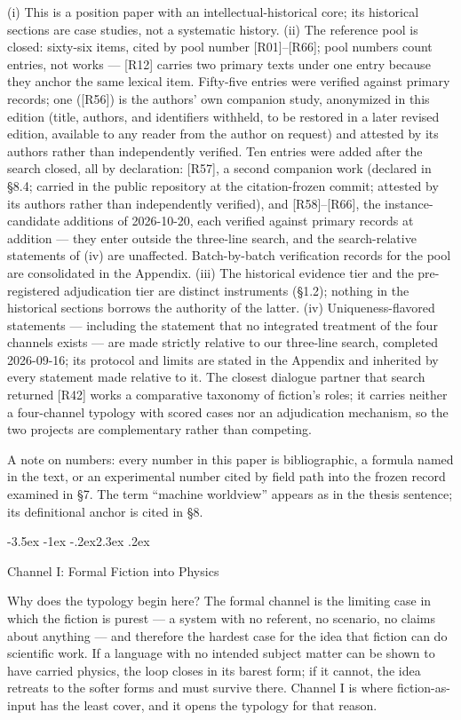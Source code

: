 \documentclass[11pt,a4paper]{article}
\makeatletter
\renewcommand\section{\@startsection{section}{1}{\z@}%
  {-3.5ex \@plus -1ex \@minus -.2ex}{2.3ex \@plus .2ex}%
  {\normalfont\Large\bfseries\raggedright}}
\makeatother
\begin{document}
(i) This is a position paper with an intellectual-historical core; its historical sections are case studies, not a systematic history. (ii) The reference pool is closed: sixty-six items, cited by pool number [R01]–[R66]; pool numbers count entries, not works — [R12] carries two primary texts under one entry because they anchor the same lexical item. Fifty-five entries were verified against primary records; one ([R56]) is the authors' own companion study, anonymized in this edition (title, authors, and identifiers withheld, to be restored in a later revised edition, available to any reader from the author on request) and attested by its authors rather than independently verified. Ten entries were added after the search closed, all by declaration: [R57], a second companion work (declared in §8.4; carried in the public repository at the citation-frozen commit; attested by its authors rather than independently verified), and [R58]–[R66], the instance-candidate additions of 2026-10-20, each verified against primary records at addition — they enter outside the three-line search, and the search-relative statements of (iv) are unaffected. Batch-by-batch verification records for the pool are consolidated in the Appendix. (iii) The historical evidence tier and the pre-registered adjudication tier are distinct instruments (§1.2); nothing in the historical sections borrows the authority of the latter. (iv) Uniqueness-flavored statements — including the statement that no integrated treatment of the four channels exists — are made strictly relative to our three-line search, completed 2026-09-16; its protocol and limits are stated in the Appendix and inherited by every statement made relative to it. The closest dialogue partner that search returned [R42] works a comparative taxonomy of fiction's roles; it carries neither a four-channel typology with scored cases nor an adjudication mechanism, so the two projects are complementary rather than competing.

A note on numbers: every number in this paper is bibliographic, a formula named in the text, or an experimental number cited by field path into the frozen record examined in §7. The term ``machine worldview'' appears as in the thesis sentence; its definitional anchor is cited in §8.

\section{Channel I: Formal Fiction into Physics}

Why does the typology begin here? The formal channel is the limiting case in which the fiction is purest --- a system with no referent, no scenario, no claims about anything --- and therefore the hardest case for the idea that fiction can do scientific work. If a language with no intended subject matter can be shown to have carried physics, the loop closes in its barest form; if it cannot, the idea retreats to the softer forms and must survive there. Channel I is where fiction-as-input has the least cover, and it opens the typology for that reason.
\end{document}
